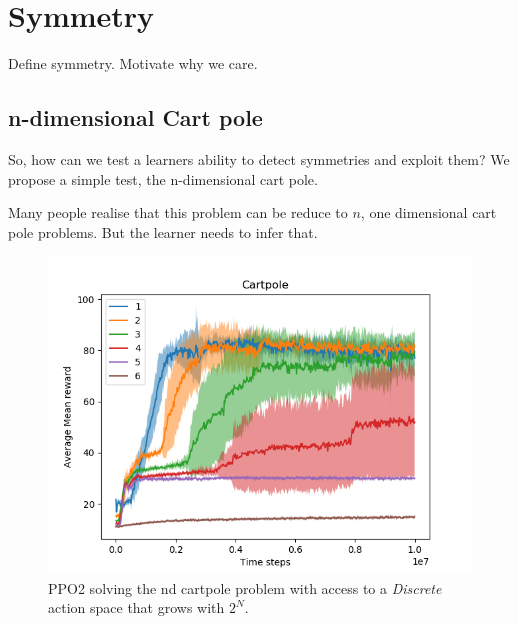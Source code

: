 \section{Symmetry}

Define symmetry. Motivate why we care.


\subsection{n-dimensional Cart pole}

So, how can we test a learners ability to detect symmetries and exploit them?
We propose a simple test, the n-dimensional cart pole.

Many people realise that this problem can be reduce to $n$, one dimensional cart pole problems.
But the learner needs to infer that.

\cite{Brockman2016,baselines}

\begin{figure}
\centering
\includegraphics[width=1\textwidth,height=0.5\textheight]{../../pictures/figures/discrete-nd-cart.png}
\caption{PPO2 solving the nd cartpole problem with access to a \textit{Discrete} action space that grows with $2^N$.}
\end{figure}


